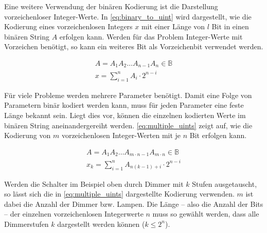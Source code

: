 Eine weitere Verwendung der binären Kodierung ist die Darstellung vorzeichenloser Integer-Werte. In \ref{eq:binary_to_uint} wird dargestellt, wie die Kodierung eines vorzeichenlosen Integers $x$ mit einer Länge von $l$ Bit in einen binären String $A$ erfolgen kann. Werden für das Problem Integer-Werte mit Vorzeichen benötigt, so kann ein weiteres Bit als Vorzeichenbit verwendet werden. 

\begin{gather}
A = A_1 A_2 \dots A_{n-1} A_n \in \mathbb{B} \nonumber \\
\label{eq:binary_to_uint}
x = \sum\limits_{i=1}^n A_i \cdot 2^{n-i}
\end{gather}

Für viele Probleme werden mehrere Parameter benötigt. Damit eine Folge von Parametern binär kodiert werden kann, muss für jeden Parameter eine feste Länge bekannt sein. Liegt dies vor, können die einzelnen kodierten Werte im binären String aneinandergereiht werden. \ref{eq:multiple_uints} zeigt auf, wie die Kodierung von $m$ vorzeichenlosen Integer-Werten mit je $n$ Bit erfolgen kann. 

\begin{gather}
A = A_1 A_2 \dots A_{m \cdot n-1} A_{m \cdot n} \in \mathbb{B} \nonumber \\
\label{eq:multiple_uints}
x_k = \sum\limits_{i=1}^n A_{n(k-1)+i} \cdot 2^{n-i}
\end{gather}

Werden die Schalter im Beispiel oben durch Dimmer mit $k$ Stufen ausgetauscht, so lässt sich die in \ref{eq:multiple_uints} dargestellte Kodierung verwenden. $m$ ist dabei die Anzahl der Dimmer bzw. Lampen. Die Länge -- also die Anzahl der Bits -- der einzelnen vorzeichenlosen Integerwerte $n$ muss so gewählt werden, dass alle Dimmerstufen $k$ dargestellt werden können ($k \le 2^n$). 


